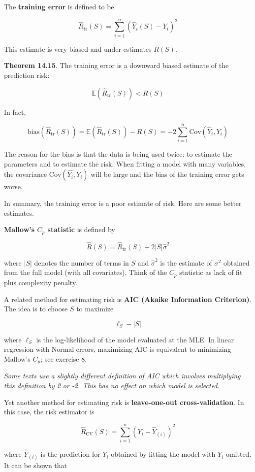 The \textbf{training error} is defined to be

\[\hat{R}_\text{tr}(S) = \sum_{i=1}^n (\hat{Y}_i(S) - Y_i)^2 \]

This estimate is very biased and under-estimates \(R(S)\).

\textbf{Theorem 14.15}. The training error is a downward biased estimate
of the prediction risk:

\[ \mathbb{E}(\hat{R}_\text{tr}(S)) < R(S) \]

In fact,

\[\text{bias}(\hat{R}_\text{tr}(S)) = \mathbb{E}(\hat{R}_\text{tr}(S)) - R(S) = -2 \sum_{i=1}^n \text{Cov}(\hat{Y}_i, Y_i)\]

The reason for the bias is that the data is being used twice: to
estimate the parameters and to estimate the risk. When fitting a model
with many variables, the covariance \(\text{Cov}(\hat{Y_i}, Y_i)\) will
be large and the bias of the training error gets worse.

In summary, the training error is a poor estimate of risk. Here are some
better estimates.

\textbf{Mallow's \(C_p\) statistic} is defined by

\[\hat{R}(S) = \hat{R}_\text{tr}(S) + 2 |S| \hat{\sigma}^2\]

where \(|S|\) denotes the number of terms in \(S\) and
\(\hat{\sigma}^2\) is the estimate of \(\sigma^2\) obtained from the
full model (with all covariates). Think of the \(C_p\) statistic as lack
of fit plus complexity penalty.

A related method for estimating risk is \textbf{AIC (Akaike Information
Criterion)}. The idea is to choose \(S\) to maximize

\[ \ell_S - |S|\]

where \(\ell_S\) is the log-likelihood of the model evaluated at the
MLE. In linear regression with Normal errors, maximizing AIC is
equivalent to minimizing Mallow's \(C_p\); see exercise 8.

\emph{Some texts use a slightly different definition of AIC which
involves multiplying this definition by 2 or -2. This has no effect on
which model is selected.}

Yet another method for estimating risk is \textbf{leave-one-out
cross-validation}. In this case, the risk estimator is

\[\hat{R}_\text{CV}(S) = \sum_{i=1}^n (Y_i - \hat{Y}_{(i)})^2 \]

where \(\hat{Y}_{(i)}\) is the prediction for \(Y_i\) obtained by
fitting the model with \(Y_i\) omitted. It can be shown that

